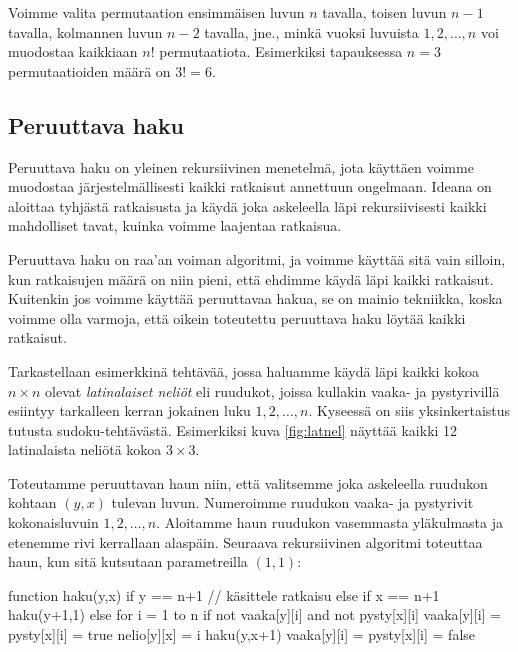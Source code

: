 Voimme valita permutaation ensimmäisen luvun $n$ tavalla,
toisen luvun $n-1$ tavalla,
kolmannen luvun $n-2$ tavalla, jne.,
minkä vuoksi luvuista $1,2,\dots,n$ voi muodostaa
kaikkiaan $n!$ permutaatiota.
Esimerkiksi tapauksessa $n=3$ permutaatioiden määrä on $3!=6$.

\subsection{Peruuttava haku}


Peruuttava haku on yleinen rekursiivinen menetelmä,
jota käyttäen voimme muodostaa järjestelmällisesti
kaikki ratkaisut annettuun ongelmaan.
Ideana on aloittaa tyhjästä ratkaisusta ja käydä
joka askeleella läpi rekursiivisesti kaikki mahdolliset tavat,
kuinka voimme laajentaa ratkaisua.

Peruuttava haku on raa'an voiman algoritmi,
ja voimme käyttää sitä vain silloin,
kun ratkaisujen määrä on niin pieni,
että ehdimme käydä läpi kaikki ratkaisut.
Kuitenkin jos voimme käyttää peruuttavaa hakua,
se on mainio tekniikka,
koska voimme olla varmoja, että oikein toteutettu
peruuttava haku löytää kaikki ratkaisut.

Tarkastellaan esimerkkinä tehtävää, jossa haluamme käydä läpi
kaikki kokoa $n \times n$ olevat \emph{latinalaiset neliöt}
eli ruudukot, joissa kullakin vaaka- ja pystyrivillä
esiintyy tarkalleen kerran jokainen luku $1,2,\dots,n$.
Kyseessä on siis yksinkertaistus tutusta sudoku-tehtävästä.
Esimerkiksi kuva \ref{fig:latnel} näyttää kaikki 12 latinalaista neliötä kokoa $3 \times 3$.

Toteutamme peruuttavan haun niin, että valitsemme joka askeleella
ruudukon kohtaan $(y,x)$ tulevan luvun.
Numeroimme ruudukon vaaka- ja pystyrivit kokonaisluvuin $1,2,\dots,n$.
Aloitamme haun ruudukon vasemmasta yläkul\-masta ja etenemme
rivi kerrallaan alaspäin.
Seuraava rekursiivinen algoritmi toteuttaa haun,
kun sitä kutsutaan parametreilla $(1,1)$:

\begin{code}
function haku(y,x)
    if y == n+1
        // käsittele ratkaisu
    else if x == n+1
        haku(y+1,1)
    else
        for i = 1 to n
            if not vaaka[y][i] and not pysty[x][i]
                vaaka[y][i] = pysty[x][i] = true
                nelio[y][x] = i
                haku(y,x+1)
                vaaka[y][i] = pysty[x][i] = false
\end{code}

